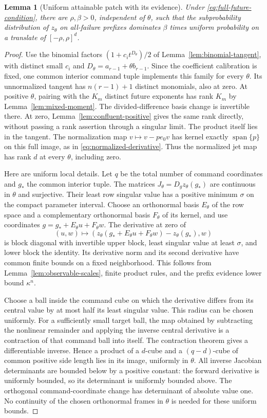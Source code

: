 \documentclass[11pt]{amsart}
\newtheorem{lemma}[theorem]{Lemma}
\theoremstyle{definition}\newtheorem{definition}[theorem]{Definition}
\theoremstyle{remark}\newtheorem{remark}[theorem]{Remark}
\DeclareMathOperator{\spanop}{span}\DeclareMathOperator{\rank}{rank}
\begin{document}
\begin{lemma}[Uniform attainable patch with its evidence]\label{lem:uniform-patch}
Under \eqref{eq:full-future-condition}, there are $\rho,\beta>0$,
independent of $\theta$, such that the subprobability distribution of
$z_\theta$ on all-failure prefixes dominates $\beta$ times uniform
probability on a translate of $[-\rho,\rho]^d$.
\end{lemma}
\begin{proof}
Use the binomial factors $(1+c_it^{D_\theta})/2$ of
Lemma~\ref{lem:binomial-tangent}, with distinct small $c_i$ and
$D_\theta=a_{r-1}+\theta b_{r-1}$. Since the coefficient calibration is
fixed, one common interior command tuple implements this family for every
$\theta$. Its unnormalized tangent has $n(r-1)+1$ distinct monomials,
also at zero. At positive $\theta$, pairing with the $K_m$ distinct
future exponents has rank $K_m$ by Lemma~\ref{lem:mixed-moment}.
The divided-difference basis change is invertible there. At zero,
Lemma~\ref{lem:confluent-positive} gives the same rank directly, without
passing a rank assertion through a singular limit. The product itself
lies in the tangent. The normalization map
$v\mapsto v-p e_0v$ has kernel exactly $\spanop\{p\}$ on this full
image, as in \eqref{eq:normalized-derivative}. Thus the normalized jet
map has rank $d$ at every $\theta$, including zero.

Here are uniform local details. Let $q$ be the total number of command
coordinates and $g_*$ the common interior tuple. The matrices
$J_\theta=D_gz_\theta(g_*)$ are continuous in $\theta$ and surjective.
Their least row singular value has a positive minimum $\sigma$ on the
compact parameter interval. Choose an orthonormal basis $E_\theta$ of
the row space and a complementary orthonormal basis $F_\theta$ of its
kernel, and use coordinates $g=g_*+E_\theta u+F_\theta w$.
The derivative at zero of
\[
 (u,w)\longmapsto
       (z_\theta(g_*+E_\theta u+F_\theta w)-z_\theta(g_*),w)
\]
is block diagonal with invertible upper block, least singular value at
least $\sigma$, and lower block the identity. Its derivative norm and
its second derivative have common finite bounds on a fixed neighborhood.
This follows from Lemma~\ref{lem:observable-scales}, finite product
rules, and the prefix evidence lower bound $\kappa^n$.

Choose a ball inside the command cube on which the derivative differs
from its central value by at most half its least singular value. This
radius can be chosen uniformly. For a sufficiently small target ball,
the map obtained by subtracting the nonlinear remainder and applying the
inverse central derivative is a contraction of that command ball into
itself. The contraction theorem gives a differentiable inverse. Hence a
product of a $d$-cube and a $(q-d)$-cube of common positive side length
lies in its image, uniformly in $\theta$. All inverse Jacobian
determinants are bounded below by a positive constant: the forward
derivative is uniformly bounded, so its determinant is uniformly bounded
above. The orthogonal command-coordinate change has determinant of
absolute value one. No continuity of the chosen orthonormal frames in
$\theta$ is needed for these uniform bounds.


\end{proof}
\end{document}
